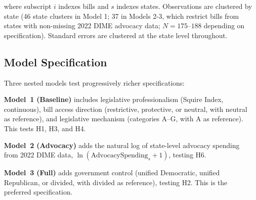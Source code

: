 \noindent where subscript $i$ indexes bills and $s$ indexes states. Observations are clustered by state (46 state clusters in Model 1; 37 in Models 2-3, which restrict bills from states with non-missing 2022 DIME advocacy data; $N = 175$--$188$ depending on specification). Standard errors are clustered at the state level throughout.

\subsection{Model Specification}
\label{sec:model_spec}
Three nested models test progressively richer specifications:

\textbf{Model~1 (Baseline)} includes legislative professionalism (Squire Index, continuous), bill access direction (restrictive, protective, or neutral, with neutral as reference), and legislative mechanism (categories A--G, with A as reference). This tests H1, H3, and H4.

\textbf{Model~2 (Advocacy)} adds the natural log of state-level advocacy spending from 2022 DIME data, $\ln(\text{AdvocacySpending}_s + 1)$, testing H6.

\textbf{Model~3 (Full)} adds government control (unified Democratic, unified Republican, or divided, with divided as reference), testing H2. This is the preferred specification.

